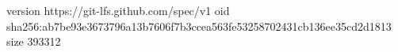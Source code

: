 version https://git-lfs.github.com/spec/v1
oid sha256:ab7be93e3673796a13b7606f7b3ccea563fe53258702431cb136ee35cd2d1813
size 393312
